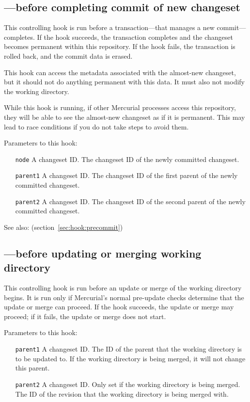 \subsection{---before completing commit of new changeset}
\label{sec:hook:pretxncommit}

This controlling hook is run before a transaction---that manages a new
commit---completes.  If the hook succeeds, the transaction completes
and the changeset becomes permanent within this repository.  If the
hook fails, the transaction is rolled back, and the commit data is
erased.

This hook can access the metadata associated with the almost-new
changeset, but it should not do anything permanent with this data.  It
must also not modify the working directory.

While this hook is running, if other Mercurial processes access this
repository, they will be able to see the almost-new changeset as if it
is permanent.  This may lead to race conditions if you do not take
steps to avoid them.

Parameters to this hook:
\begin{itemize}
\item[\texttt{node}] A changeset ID.  The changeset ID of the newly
  committed changeset.
\item[\texttt{parent1}] A changeset ID.  The changeset ID of the first
  parent of the newly committed changeset.
\item[\texttt{parent2}] A changeset ID.  The changeset ID of the second
  parent of the newly committed changeset.
\end{itemize}

See also:  (section~\ref{sec:hook:precommit})

\subsection{---before updating or merging working directory}
\label{sec:hook:preupdate}

This controlling hook is run before an update or merge of the working
directory begins.  It is run only if Mercurial's normal pre-update
checks determine that the update or merge can proceed.  If the hook
succeeds, the update or merge may proceed; if it fails, the update or
merge does not start.

Parameters to this hook:
\begin{itemize}
\item[\texttt{parent1}] A changeset ID.  The ID of the parent that the
  working directory is to be updated to.  If the working directory is
  being merged, it will not change this parent.
\item[\texttt{parent2}] A changeset ID.  Only set if the working
  directory is being merged.  The ID of the revision that the working
  directory is being merged with.
\end{itemize}

